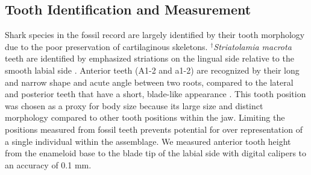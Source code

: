 \documentclass[]{rsos}%
\begin{document}

\subsection{Tooth Identification and Measurement}
Shark species in the fossil record are largely identified by their tooth morphology \cite{Cappetta2012} due to the poor preservation of cartilaginous skeletons. 
${}^\dag$\emph{Striatolamia macrota} teeth are identified by emphasized striations on the lingual side relative to the smooth labial side \cite{Cappetta2012}. 
Anterior teeth (A1-2 and a1-2) are recognized by their long and narrow shape and acute angle between two roots, compared to the lateral and posterior teeth that have a short, blade-like appearance \cite{Cunningham2000,Padilla2014, Cappetta2012}. 
This tooth position was chosen as a proxy for body size because its large size and distinct morphology compared to other tooth positions within the jaw. 
Limiting the positions measured from fossil teeth prevents potential for over representation of a single individual within the assemblage. 
We measured anterior tooth height from the enameloid base to the blade tip of the labial side with digital calipers to an accuracy of 0.1 mm. 
\end{document}
